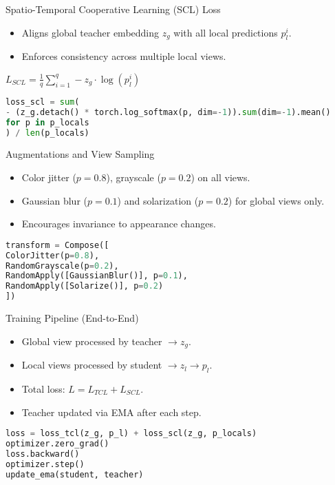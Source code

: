 \documentclass{beamer}
\begin{document}
\begin{frame}[fragile]{Spatio-Temporal Cooperative Learning (SCL) Loss}
    \begin{itemize}
        \item Aligns global teacher embedding $z_g$ with all local predictions $p_l^i$.
        \item Enforces consistency across multiple local views.
    \end{itemize}
    \begin{math}
        L_{SCL} = \frac{1}{q}\sum_{i=1}^q - z_g \cdot \log(p_l^i)
    \end{math}
    \begin{lstlisting}[language=Python, basicstyle=\ttfamily\scriptsize]
loss_scl = sum(
- (z_g.detach() * torch.log_softmax(p, dim=-1)).sum(dim=-1).mean()
for p in p_locals
) / len(p_locals)
\end{lstlisting}
\end{frame}

\begin{frame}[fragile]{Augmentations and View Sampling}
    \begin{itemize}
        \item Color jitter ($p=0.8$), grayscale ($p=0.2$) on all views.
        \item Gaussian blur ($p=0.1$) and solarization ($p=0.2$) for global views only.
        \item Encourages invariance to appearance changes.
    \end{itemize}
    \begin{lstlisting}[language=Python, basicstyle=\ttfamily\scriptsize]
transform = Compose([
ColorJitter(p=0.8),
RandomGrayscale(p=0.2),
RandomApply([GaussianBlur()], p=0.1),
RandomApply([Solarize()], p=0.2)
])
\end{lstlisting}
\end{frame}

\begin{frame}[fragile]{Training Pipeline (End-to-End)}
    \begin{itemize}
        \item Global view processed by teacher $\rightarrow z_g$.
        \item Local views processed by student $\rightarrow z_l \rightarrow p_l$.
        \item Total loss: $L = L_{TCL} + L_{SCL}$.
        \item Teacher updated via EMA after each step.
    \end{itemize}
    \begin{lstlisting}[language=Python, basicstyle=\ttfamily\scriptsize]
loss = loss_tcl(z_g, p_l) + loss_scl(z_g, p_locals)
optimizer.zero_grad()
loss.backward()
optimizer.step()
update_ema(student, teacher)
\end{lstlisting}
\end{frame}
\end{document}
